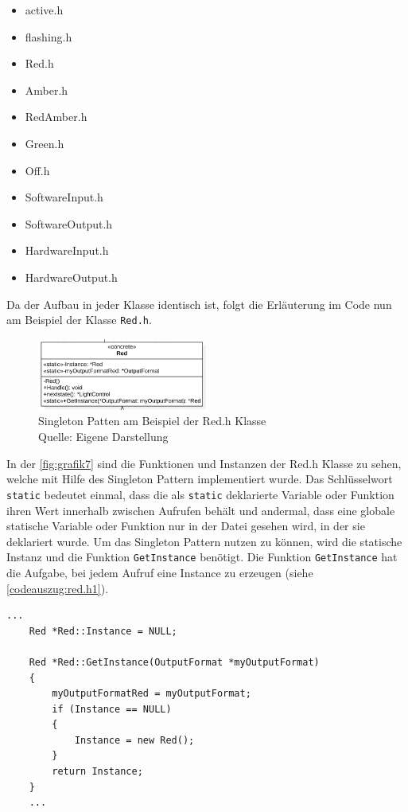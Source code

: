 \begin{itemize}
	\item active.h
	\item flashing.h
	\item Red.h
	\item Amber.h
	\item RedAmber.h
	\item Green.h
	\item Off.h
	\item SoftwareInput.h
	\item SoftwareOutput.h
	\item HardwareInput.h
	\item HardwareOutput.h
\end{itemize}

Da der Aufbau in jeder Klasse identisch ist, folgt die Erläuterung im Code nun am Beispiel der Klasse \texttt{Red.h}.\\

\begin{figure}[H] 
	\centering
	\includegraphics[width=0.5\textwidth]{images/07.png}
	\caption{Singleton Patten am Beispiel der Red.h Klasse \protect \\ Quelle: Eigene Darstellung }
	\label{fig:grafik7}
\end{figure}

In der \autoref{fig:grafik7} sind die Funktionen und Instanzen der Red.h Klasse zu sehen, welche mit Hilfe des Singleton Pattern implementiert wurde. Das Schlüsselwort \texttt{static} bedeutet einmal, dass die als \texttt{static} deklarierte Variable oder Funktion ihren Wert innerhalb zwischen Aufrufen behält und andermal, dass eine globale statische Variable oder Funktion nur in der Datei \glqq gesehen\grqq{} wird, in der sie deklariert wurde. Um das Singleton Pattern nutzen zu können, wird die statische Instanz und die Funktion \texttt{GetInstance} benötigt. Die Funktion \texttt{GetInstance} hat die Aufgabe, bei jedem Aufruf eine Instance zu erzeugen (siehe \autoref{codeauszug:red.h1}). \\

\begin{lstlisting}[style=myC,caption={Red.cpp - Singleton in der Klasse Red},label={codeauszug:red.h1},captionpos=b]
	...
	Red *Red::Instance = NULL;
	
	Red *Red::GetInstance(OutputFormat *myOutputFormat)
	{
		myOutputFormatRed = myOutputFormat; 
		if (Instance == NULL)
		{
			Instance = new Red();
		}
		return Instance;
	}
	...
\end{lstlisting}

